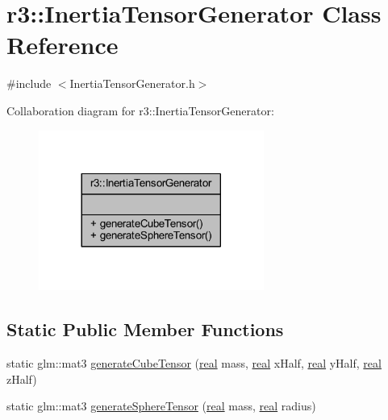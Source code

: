 \hypertarget{classr3_1_1_inertia_tensor_generator}{}\section{r3\+:\+:Inertia\+Tensor\+Generator Class Reference}
\label{classr3_1_1_inertia_tensor_generator}


{\ttfamily \#include $<$Inertia\+Tensor\+Generator.\+h$>$}



Collaboration diagram for r3\+:\+:Inertia\+Tensor\+Generator\+:\nopagebreak
\begin{figure}[H]
\begin{center}
\leavevmode
\includegraphics[width=209pt]{classr3_1_1_inertia_tensor_generator__coll__graph}
\end{center}
\end{figure}
\subsection*{Static Public Member Functions}
\begin{DoxyCompactItemize}
\item 
static glm\+::mat3 \mbox{\hyperlink{classr3_1_1_inertia_tensor_generator_ae4d92045858bfe898a3bc6c779fe3d9b}{generate\+Cube\+Tensor}} (\mbox{\hyperlink{namespacer3_ab2016b3e3f743fb735afce242f0dc1eb}{real}} mass, \mbox{\hyperlink{namespacer3_ab2016b3e3f743fb735afce242f0dc1eb}{real}} x\+Half, \mbox{\hyperlink{namespacer3_ab2016b3e3f743fb735afce242f0dc1eb}{real}} y\+Half, \mbox{\hyperlink{namespacer3_ab2016b3e3f743fb735afce242f0dc1eb}{real}} z\+Half)
\item 
static glm\+::mat3 \mbox{\hyperlink{classr3_1_1_inertia_tensor_generator_a637b526735235ca96cab6e7414f7a8c2}{generate\+Sphere\+Tensor}} (\mbox{\hyperlink{namespacer3_ab2016b3e3f743fb735afce242f0dc1eb}{real}} mass, \mbox{\hyperlink{namespacer3_ab2016b3e3f743fb735afce242f0dc1eb}{real}} radius)
\end{DoxyCompactItemize}



